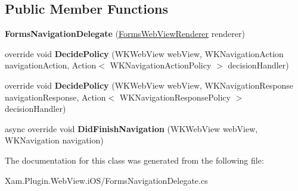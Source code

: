 \subsection*{Public Member Functions}
\begin{DoxyCompactItemize}
\item 
\mbox{\label{class_xam_1_1_plugin_1_1_web_view_1_1i_o_s_1_1_forms_navigation_delegate_adc97f6b485f3c1d9c78cd7f51791536a}} 
{\bfseries Forms\+Navigation\+Delegate} (\hyperlink{class_xam_1_1_plugin_1_1_web_view_1_1i_o_s_1_1_forms_web_view_renderer}{Forms\+Web\+View\+Renderer} renderer)
\item 
\mbox{\label{class_xam_1_1_plugin_1_1_web_view_1_1i_o_s_1_1_forms_navigation_delegate_a782e2a7723c37e425da935974b9f644f}} 
override void {\bfseries Decide\+Policy} (W\+K\+Web\+View web\+View, W\+K\+Navigation\+Action navigation\+Action, Action$<$ W\+K\+Navigation\+Action\+Policy $>$ decision\+Handler)
\item 
\mbox{\label{class_xam_1_1_plugin_1_1_web_view_1_1i_o_s_1_1_forms_navigation_delegate_ac4051c11d9d2f8bf4b811d4fecf0848d}} 
override void {\bfseries Decide\+Policy} (W\+K\+Web\+View web\+View, W\+K\+Navigation\+Response navigation\+Response, Action$<$ W\+K\+Navigation\+Response\+Policy $>$ decision\+Handler)
\item 
\mbox{\label{class_xam_1_1_plugin_1_1_web_view_1_1i_o_s_1_1_forms_navigation_delegate_a6907ba8465b1d20ee4b75a7075d52b1e}} 
async override void {\bfseries Did\+Finish\+Navigation} (W\+K\+Web\+View web\+View, W\+K\+Navigation navigation)
\end{DoxyCompactItemize}


The documentation for this class was generated from the following file\+:\begin{DoxyCompactItemize}
\item 
Xam.\+Plugin.\+Web\+View.\+i\+O\+S/Forms\+Navigation\+Delegate.\+cs\end{DoxyCompactItemize}
